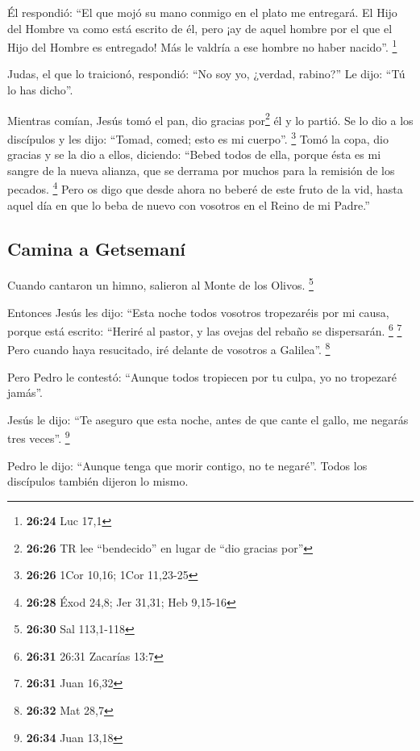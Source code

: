 \begin{paracol}{2}
 Él respondió: ``El que mojó su mano conmigo en el plato
me entregará.  El Hijo del Hombre va como está escrito de
él, pero ¡ay de aquel hombre por el que el Hijo del Hombre es entregado!
Más le valdría a ese hombre no haber nacido''. \footnote{\textbf{26:24}
  Luc 17,1}

 Judas, el que lo traicionó, respondió: ``No soy yo,
¿verdad, rabino?'' Le dijo: ``Tú lo has dicho''.

 Mientras comían, Jesús tomó el pan, dio gracias
por\footnote{\textbf{26:26} TR lee ``bendecido'' en lugar de ``dio
  gracias por''} él y lo partió. Se lo dio a los discípulos y les dijo:
``Tomad, comed; esto es mi cuerpo''. \footnote{\textbf{26:26} 1Cor
  10,16; 1Cor 11,23-25}  Tomó la copa, dio gracias y se
la dio a ellos, diciendo: ``Bebed todos de ella,  porque
ésta es mi sangre de la nueva alianza, que se derrama por muchos para la
remisión de los pecados. \footnote{\textbf{26:28} Éxod 24,8; Jer 31,31;
  Heb 9,15-16}  Pero os digo que desde ahora no beberé de
este fruto de la vid, hasta aquel día en que lo beba de nuevo con
vosotros en el Reino de mi Padre.''

\hypertarget{camina-a-getsemanuxed}{%
\subsection{Camina a Getsemaní}\label{camina-a-getsemanuxed}}

 Cuando cantaron un himno, salieron al Monte de los
Olivos. \footnote{\textbf{26:30} Sal 113,1-118}

 Entonces Jesús les dijo: ``Esta noche todos vosotros
tropezaréis por mi causa, porque está escrito: ``Heriré al pastor, y las
ovejas del rebaño se dispersarán. \footnote{\textbf{26:31} 26:31
  Zacarías 13:7} \footnote{\textbf{26:31} Juan 16,32} 
Pero cuando haya resucitado, iré delante de vosotros a Galilea''.
\footnote{\textbf{26:32} Mat 28,7}

 Pero Pedro le contestó: ``Aunque todos tropiecen por tu
culpa, yo no tropezaré jamás''.

 Jesús le dijo: ``Te aseguro que esta noche, antes de que
cante el gallo, me negarás tres veces''. \footnote{\textbf{26:34} Juan
  13,18}

 Pedro le dijo: ``Aunque tenga que morir contigo, no te
negaré''. Todos los discípulos también dijeron lo mismo.


\end{paracol}
